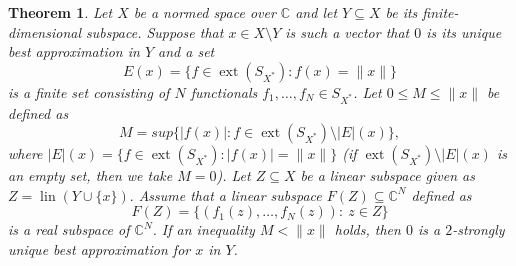\documentclass[12pt, reqno]{amsart}
\newtheorem{twr}{Theorem}[section]
\theoremstyle{definition}
\theoremstyle{remark}
\numberwithin{equation}{section}
\DeclareMathOperator{\lin}{lin}
\DeclareMathOperator{\ext}{ext}
\begin{document}
\begin{twr}
\label{twr2strgeneral}
Let $X$ be a normed space over $\mathbb{C}$ and let $Y \subseteq X$ be its finite-dimensional subspace. Suppose that $x \in X \setminus Y$ is such a vector that $0$ is its unique best approximation in $Y$ and a set
$$
E(x) = \{ f \in \ext(S_{X^*}): f(x) = \|x\| \}
$$
is a finite set consisting of $N$ functionals $f_1, \ldots, f_N \in S_{X^*}$. Let $0 \leq M \leq \|x\|$ be defined as
$$
M= sup\{|f(x)|: f \in \ext(S_{X^*} )\setminus |E|(x) \},
$$
where $ |E|(x) = \{ f \in \ext(S_{X^*}): |f(x)| = \|x\| \}$ (if $\ext(S_{X^*})\setminus |E|(x)$ is an empty set, then we take $M=0$). Let $Z \subseteq X$ be a linear subspace given as $Z=  \lin(Y \cup \{x\}).$ Assume that a linear subspace $F(Z) \subseteq \mathbb{C}^N$ defined as
$$ 
F(Z) = \{ (f_1(z), \ldots ,f_N(z)): \: z \in Z\}
$$
is a real subspace of $\mathbb{C}^N$. If an inequality $M < \|x\|$ holds, then $0$ is a $2$-strongly unique best approximation for $x$ in $Y$.
\end{twr}
\end{document}
